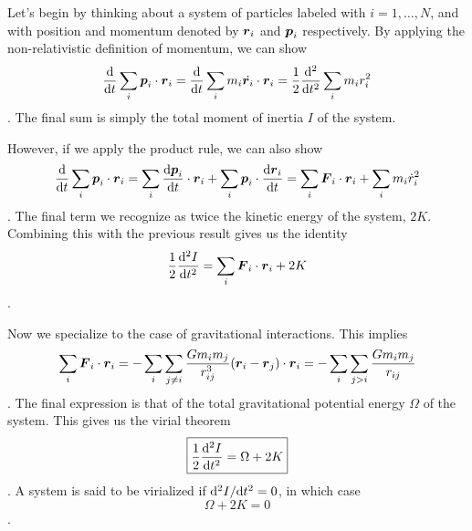 Let's begin by thinking about a system of particles labeled with $i=1,\ldots,N$, and with
position and momentum denoted by $\boldsymbol r_i$ and $\boldsymbol p_i$ respectively.  By applying the non-relativistic
definition of momentum, we can show
\begin{dmath*}
    \frac{\d}{\d t}\sum_i \b p_i\cdot\b r_i
        = \frac{\d}{\d t}\sum_i m_i\dot{\b r_i}\cdot\b r_i
        = \frac{1}{2}\frac{\d^2}{\d t^2}\sum_i m_i r_i^2
\end{dmath*}.
The final sum is simply the total moment of inertia $I$ of the system.

However, if we apply the product rule, we can also show
\begin{dmath*}
    \frac{\d}{\d t}\sum_i \b p_i\cdot\b r_i
        = \sum_i \frac{\d\b p_i}{\d t}\cdot\b r_i
            +\sum_i \b p_i\cdot\frac{\d\b r_i}{\d t}
        = \sum_i \b F_i\cdot\b r_i
            +\sum_i m_i{\dot r_i}^2
\end{dmath*}.
The final term we recognize as twice the kinetic energy of the system, $2K$.
Combining this with the previous result gives us the identity
\begin{dmath}
    \frac{1}{2}\frac{\d^2I}{\d t^2}
        = \sum_i \b F_i\cdot\b r_i+2K
\end{dmath}.

Now we specialize to the case of gravitational interactions.  This implies
\begin{dmath*}
    \sum_i \b F_i\cdot\b r_i
        = -\sum_i\sum_{j\neq i} \frac{Gm_im_j}{r_{ij}^3}(\b r_i-\b r_j)\cdot \b r_i
        = -\sum_i\sum_{j > i} \frac{Gm_im_j}{r_{ij}}
\end{dmath*}.
The final expression is that of the total gravitational potential energy $\Omega$
of the system.  This gives us the virial theorem
\begin{dmath}\boxed{
    \frac{1}{2}\frac{\d^2I}{\d t^2}
        = \Omega+2K
}\end{dmath}.
A system is said to be virialized if ${\rm d}^2I/{\rm d} t^2=0$, in which case
\begin{dmath}\boxed{
    \Omega+2K = 0
}\end{dmath}.

